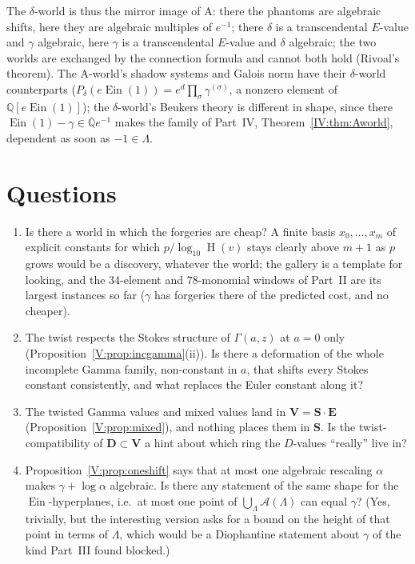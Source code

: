 \documentclass[11pt,a4paper]{article}
\newcommand{\Q}{\mathbb Q}
\newcommand{\Qbar}{\overline{\mathbb Q}}
\newcommand{\Ein}{\operatorname{Ein}}
\newcommand{\EE}{\mathbf E}
\newcommand{\DD}{\mathbf D}
\newcommand{\Sring}{\mathbf S}
\newcommand{\Vring}{\mathbf V}
\newcommand{\Aff}{\mathcal A}
\DeclareMathOperator{\Ht}{H}
\theoremstyle{definition}
\theoremstyle{remark}
\numberwithin{equation}{section}
\begin{document}
The $\delta$-world is thus the mirror image of $\mathrm A$: there the phantoms are
algebraic shifts, here they are algebraic multiples of $e^{-1}$; there $\delta$ is a
transcendental $E$-value and $\gamma$ algebraic, here $\gamma$ is a transcendental $E$-value
and $\delta$ algebraic; the two worlds are exchanged by the connection formula and cannot
both hold (Rivoal's theorem). The $\mathrm A$-world's shadow systems and Galois norm have
their $\delta$-world counterparts ($P_\delta(e\Ein(1))=e^d\prod_\sigma\gamma^{(\sigma)}$, a
nonzero element of $\Q[e\Ein(1)]$); the $\delta$-world's Beukers theory is different in
shape, since there $\Ein(1)-\gamma\in\Qbar e^{-1}$ makes the family of Part~IV,
Theorem~\ref{IV:thm:Aworld}, dependent as soon as $-1\in\Lambda$.

\section{Questions}\label{V:sec:questions}

\begin{enumerate}[label=(Q\arabic*)]
\item Is there a world in which the forgeries are cheap? A finite basis $x_0,\dots,x_m$ of
explicit constants for which $p/\log_{10}\Ht(v)$ stays clearly above $m+1$ as $p$ grows
would be a discovery, whatever the world; the gallery is a template for looking, and the
$34$-element and $78$-monomial windows of Part~II are its largest instances so far
($\gamma$ has forgeries there of the predicted cost, and no cheaper).
\item The twist respects the Stokes structure of $\Gamma(a,z)$ at $a=0$ only
(Proposition~\ref{V:prop:incgamma}(ii)). Is there a deformation of the whole incomplete Gamma
family, non-constant in $a$, that shifts every Stokes constant consistently, and what
replaces the Euler constant along it?
\item The twisted Gamma values and mixed values land in $\Vring=\Sring\cdot\EE$
(Proposition~\ref{V:prop:mixed}), and nothing places them in $\Sring$. Is the
twist-compatibility of $\DD\subset\Vring$ a hint about which ring the $D$-values
``really'' live in?
\item Proposition~\ref{V:prop:oneshift} says that at most one algebraic rescaling
$\alpha$ makes $\gamma+\log\alpha$ algebraic. Is there any statement of the same shape for
the $\Ein$-hyperplanes, i.e.\ at most one point of $\bigcup_\Lambda\Aff(\Lambda)$ can equal
$\gamma$? (Yes, trivially, but the interesting version asks for a bound on the height of
that point in terms of $\Lambda$, which would be a Diophantine statement about $\gamma$ of
the kind Part~III found blocked.)
\end{enumerate}
\end{document}
